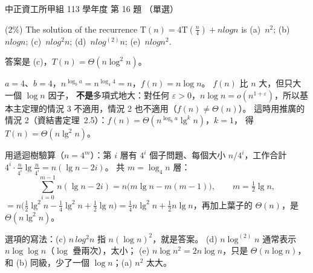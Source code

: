 \begin{pastexam}[label={px:ccu-113-swa-11}]{中正資工所甲組 113 學年度 第 16 題}
（單選）

(2\%) The solution of the recurrence $\mathrm{T}(n)=4\mathrm{T}\left(\frac{n}{4}\right)+nlogn$ is \quad (a)~$n^2$; (b)~$nlogn$; (c)~$nlog^2n$; (d)~$nlog^{(2)}n$; (e)~$nlogn^2$.
\end{pastexam}

\begin{pastsoln}
答案是 (c)，$T(n) = \Theta(n \log^2 n)$。

$a = 4$、$b = 4$，$n^{\log_b a} = n^{\log_4 4} = n$，$f(n) = n \log n$。 $f(n)$ 比 $n$ 大，但只大一個 $\log n$ 因子，
\textbf{不是}多項式地大：對任何 $\varepsilon > 0$，$n \log n = o(n^{1 + \varepsilon})$，所以基本主定理的情況 3 不適用，情況 2
也不適用（$f(n) \ne \Theta(n)$）。 這時用推廣的情況 2（資結書定理~2.5）：$f(n) = \Theta(n^{\log_b a} \lg^k n)$，$k = 1$，
得 $T(n) = \Theta(n \lg^{2} n)$。

用遞迴樹驗算（$n = 4^m$）：第 $i$ 層有 $4^i$ 個子問題、每個大小 $n/4^i$，工作合計
$4^i \cdot \frac{n}{4^i} \lg \frac{n}{4^i} = n(\lg n - 2i)$。 共 $m = \log_4 n$ 層：
\[
\sum_{i=0}^{m-1} n(\lg n - 2i) = n\bigl(m \lg n - m(m - 1)\bigr), \qquad m = \tfrac{1}{2}\lg n,
\]
$= n\bigl(\tfrac{1}{2}\lg^2 n - \tfrac{1}{4}\lg^2 n + \tfrac{1}{2}\lg n\bigr) = \tfrac{1}{4} n \lg^2 n + \tfrac{1}{2} n \lg n$，再加上葉子的
$\Theta(n)$，是 $\Theta(n \lg^2 n)$。

選項的寫法：(c) $n\,log^2 n$ 指 $n (\log n)^2$，就是答案。 (d) $n \log^{(2)} n$ 通常表示 $n \log\log n$（$\log$ 疊兩次），太小；
(e) $n \log n^2 = 2n\log n$，只是 $\Theta(n \log n)$，和 (b) 同級，少了一個 $\log n$；(a) $n^2$ 太大。
\end{pastsoln}
